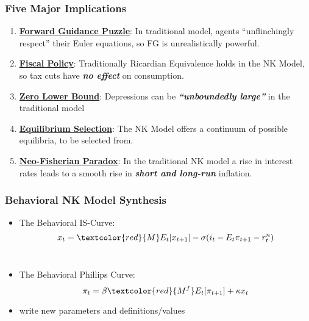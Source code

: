 \documentclass{beamer}
\begin{document}

\begin{frame}
	\frametitle{Five Major Implications}
	\begin{enumerate}
		\item \textbf{\underline{Forward Guidance Puzzle}}: In traditional model, agents ``unflinchingly respect'' their Euler equations, so FG is unrealistically powerful.
		\vspace{8pt}
		\item \textbf{\underline{Fiscal Policy}}: Traditionally Ricardian Equivalence holds in the NK Model, so tax cuts have \textit{\textbf{no effect}} on consumption.
		\vspace{8pt}
		\item \textbf{\underline{Zero Lower Bound}}: Depressions can be \textit{\textbf{``unboundedly large''}} in the traditional model
		\vspace{8pt}
		\item \textbf{\underline{Equilibrium Selection}}: The NK Model offers a continuum of possible equilibria, to be selected from.
		\vspace{8pt}
		\item \underline{\textbf{Neo-Fisherian Paradox}}: In the traditional NK model a rise in interest rates leads to a smooth rise in \textit{\textbf{short and long-run}} inflation.
	\end{enumerate}
\end{frame}


\begin{frame}
	\frametitle{Behavioral NK Model Synthesis}
	\begin{itemize}
		\item The Behavioral IS-Curve: $$x_{t}=\textcolor{red}{M}E_{t}[x_{t+1}]-\sigma(i_{t}-E_{t}\pi_{t+1}-r_{t}^{n})$$\\
		\vspace{5pt}
		\item The Behavioral Phillips Curve: $$\pi_{t}=\beta \textcolor{red}{M^{f}}E_{t}[\pi_{t+1}]+\kappa x_{t}$$
		\item write new parameters and definitions/values
	\end{itemize}
\end{frame}

\end{document}

